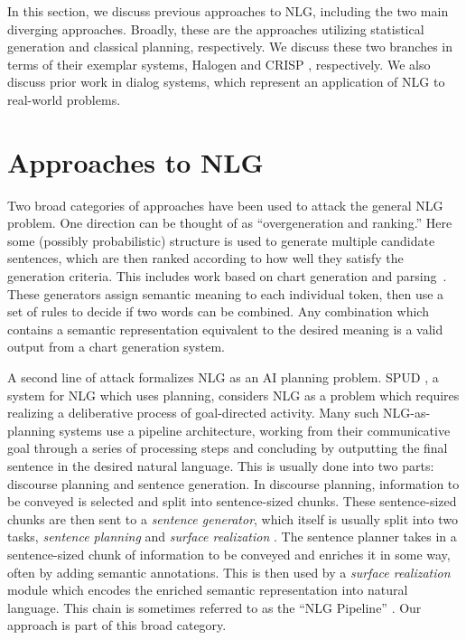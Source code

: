 In this section, we discuss previous approaches to NLG, including
the two main diverging approaches.  Broadly, these are the
approaches utilizing statistical generation and classical planning,
respectively.  We discuss these two branches in terms of their
exemplar systems, Halogen \cite{langkilde_2002_halogen}
and CRISP \cite{koller_sentence_2007}, respectively.
We also discuss prior work in dialog systems,
which represent an application of NLG to
real-world problems.

\section{Approaches to NLG}
Two broad categories of
approaches have been used to attack the general NLG problem. One
direction can be thought of as ``overgeneration and ranking.'' Here
some (possibly probabilistic) structure is used to generate multiple
candidate sentences, which are then ranked according to how well they
satisfy the generation criteria. This includes work based on chart
generation and
parsing~\cite{shieber_uniform_1988,kay_chart_1996}. These generators
assign semantic meaning to each individual token, then use a set of
rules to decide if two words can be combined.  Any combination which
contains a semantic representation equivalent to the desired meaning 
is a valid output from a chart generation
system.

A second line of attack formalizes NLG as an AI planning problem.
SPUD \cite{stone_2003_spud}, a system for NLG which uses planning,
considers NLG as a problem which requires realizing a deliberative
process of goal-directed activity.  Many such NLG-as-planning systems
use a pipeline architecture, working from their communicative goal
through a series of processing steps and concluding by outputting the
final sentence in the desired natural language. This is usually done
into two parts:
discourse planning and sentence generation. In
discourse planning, information to be conveyed is selected and split
into sentence-sized chunks. These sentence-sized chunks are then sent
to a {\em sentence generator}, which itself is usually split into two
tasks, {\em sentence planning} and {\em surface realization}
\cite{koller_experiences_2011}.  The sentence planner takes in a
sentence-sized chunk of information to be conveyed and enriches it in
some way, often by adding semantic annotations.  
This is then used by a {\em surface realization}
module which encodes the enriched semantic representation into 
 natural language.  This chain is sometimes referred to as the
``NLG Pipeline'' \cite{reiter_building_2000}.  Our approach is
part of this broad category.

